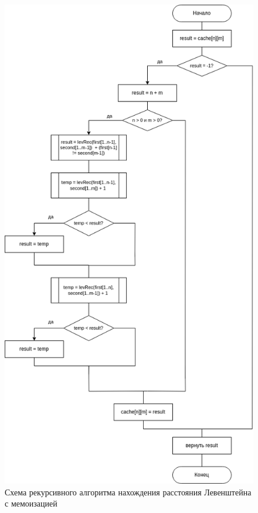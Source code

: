 \clearpage

\begin{figure}[h!]
	\centering
	\includegraphics[height=0.8\textheight]{tex_parts/scheme2.png}
	\caption{\label{fig:levMem}Схема рекурсивного алгоритма нахождения расстояния Левенштейна с мемоизацией}
\end{figure}

